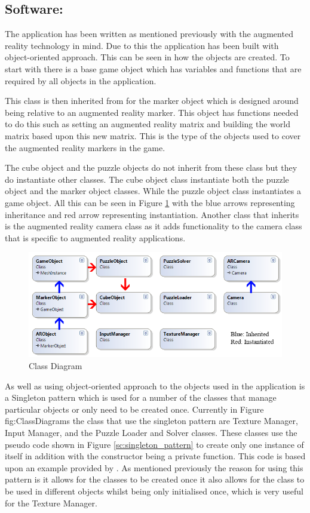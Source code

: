 \subsection{Software:}\label{sc:software}
The application has been written as mentioned previously with the augmented reality technology in mind.
Due to this the application has been built with object-oriented approach.
This can be seen in how the objects are created.
To start with there is a base game object which has variables and functions that are required by all objects in the application.

This class is then inherited from for the marker object which is designed around being relative to an augmented reality marker.
This object has functions needed to do this such as setting an augmented reality matrix and building the world matrix based upon this new matrix.
This is the type of the objects used to cover the augmented reality markers in the game.

The cube object and the puzzle objects do not inherit from these class but they do instantiate other classes.
The cube object class instantiate both the puzzle object and the marker object classes.
While the puzzle object class instantiates a game object.
All this can be seen in Figure \ref{fig:ClassDiagrams} with the blue arrows representing inheritance and red arrow representing instantiation.
Another class that inherits is the augmented reality camera class as it adds functionality to the camera class that is specific to augmented reality applications.

\begin{figure}[ht!]
	\label{fig:ClassDiagrams}
	\centering
	\includegraphics[width=120mm]{images/ClassDiagram2.PNG}
	\caption{Class Diagram}
\end{figure}

As well as using object-oriented approach to the objects used in the application is a Singleton pattern which is used for a number of the classes that manage particular objects or only need to be created once.
Currently in Figure {fig:ClassDiagrams} the class that use the singleton pattern are Texture Manager, Input Manager, and the Puzzle Loader and Solver classes.
These classes use the pseudo code shown in Figure \ref{sc:singleton_pattern} to create only one instance of itself in addition with the constructor being a private function.
This code is based upon an example provided by \cite{codeproject2002}. 
As mentioned previously the reason for using this pattern is it allows for the classes to be created once it also allows for the class to be used in different objects whilst being only initialised once, which is very useful for the Texture Manager.


